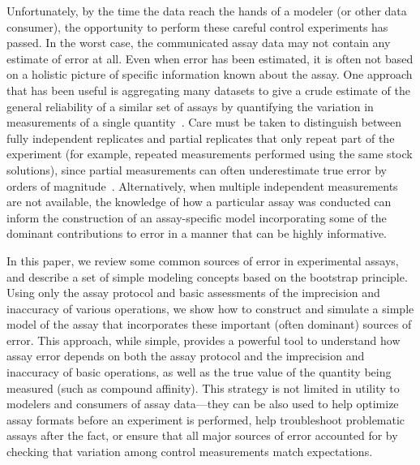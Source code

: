 \documentclass[aps,pre,twocolumn,nofootinbib,superscriptaddress,linenumbers]{revtex4-1}
\begin{document}
Unfortunately, by the time the data reach the hands of a modeler (or other data consumer), the opportunity to perform these careful control experiments has passed.
In the worst case, the communicated assay data may not contain any estimate of error at all. 
Even when error has been estimated, it is often not based on a holistic picture of specific information known about the assay.
One approach that has been useful is aggregating many datasets to give a crude estimate of the general reliability of a similar set of assays by quantifying the variation in measurements of a single quantity~\cite{kramer_experimental_2012,kalliokoski_comparability_2013}. 
Care must be taken to distinguish between fully independent replicates and partial replicates that only repeat part of the experiment (for example, repeated measurements performed using the same stock solutions), since partial measurements can often underestimate true error by orders of magnitude~\cite{jdc-itc-paper}.
Alternatively, when multiple independent measurements are not available, the knowledge of how a particular assay was conducted can inform the construction of an assay-specific model incorporating some of the dominant contributions to error in a manner that can be highly informative.

In this paper, we review some common sources of error in experimental assays, and describe a set of simple modeling concepts based on the bootstrap principle.
Using only the assay protocol and basic assessments of the imprecision and inaccuracy of various operations, we show how to construct and simulate a simple model of the assay that incorporates these important (often dominant) sources of error. 
This approach, while simple, provides a powerful tool to understand how assay error depends on both the assay protocol and the imprecision and inaccuracy of basic operations, as well as the true value of the quantity being measured (such as compound affinity). 
This strategy is not limited in utility to modelers and consumers of assay data---they can be also used to help optimize assay formats before an experiment is performed, help troubleshoot problematic assays after the fact, or ensure that all major sources of error accounted for by checking that variation among control measurements match expectations.
\end{document}
